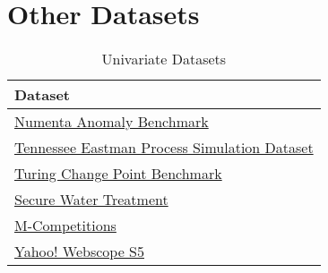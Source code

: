 


\section{Other Datasets}
\begin{table}[h]\centering
        \begin{tabular}{l}
            Dataset                                                                                                                             \\\midrule
            \href{https://github.com/numenta/NAB}{Numenta Anomaly Benchmark}                                                                    \\\addlinespace
            \href{https://www.kaggle.com/averkij/tennessee-eastman-process-simulation-dataset}{Tennessee Eastman Process Simulation Dataset}    \\\addlinespace
            \href{https://github.com/alan-turing-institute/TCPDBench}{Turing Change Point Benchmark}                                            \\\addlinespace
            \href{https://itrust.sutd.edu.sg/testbeds/secure-water-treatment-swat/}{Secure Water Treatment}                                     \\\addlinespace
            \href{https://en.wikipedia.org/wiki/Makridakis\_Competitions}{M-Competitions}                                                       \\\addlinespace
            \href{https://webscope.sandbox.yahoo.com/catalog.php?datatype=s\&did=70}{Yahoo! Webscope S5}                                        \\
        \end{tabular}
    \caption{Univariate Datasets}\label{tab:univariate-datasets}
\end{table}

